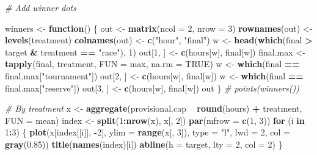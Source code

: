 \documentclass[]{article}
\newenvironment{Shaded}{\begin{snugshade}}{\end{snugshade}}
\newcommand{\KeywordTok}[1]{\textcolor[rgb]{0.13,0.29,0.53}{\textbf{#1}}}
\newcommand{\DataTypeTok}[1]{\textcolor[rgb]{0.13,0.29,0.53}{#1}}
\newcommand{\DecValTok}[1]{\textcolor[rgb]{0.00,0.00,0.81}{#1}}
\newcommand{\FloatTok}[1]{\textcolor[rgb]{0.00,0.00,0.81}{#1}}
\newcommand{\StringTok}[1]{\textcolor[rgb]{0.31,0.60,0.02}{#1}}
\newcommand{\CommentTok}[1]{\textcolor[rgb]{0.56,0.35,0.01}{\textit{#1}}}
\newcommand{\OtherTok}[1]{\textcolor[rgb]{0.56,0.35,0.01}{#1}}
\newcommand{\ControlFlowTok}[1]{\textcolor[rgb]{0.13,0.29,0.53}{\textbf{#1}}}
\newcommand{\OperatorTok}[1]{\textcolor[rgb]{0.81,0.36,0.00}{\textbf{#1}}}
\newcommand{\NormalTok}[1]{#1}
\let\oldShaded\Shaded
\let\endoldShaded\endShaded
\renewenvironment{Shaded}{\footnotesize\oldShaded}{\endoldShaded}
\begin{document}
\begin{Shaded}
\begin{Highlighting}[]
\CommentTok{# Add winner dots}

\NormalTok{winners <-}\StringTok{ }\ControlFlowTok{function}\NormalTok{() \{}
\NormalTok{    out <-}\StringTok{ }\KeywordTok{matrix}\NormalTok{(}\DataTypeTok{ncol =} \DecValTok{2}\NormalTok{, }\DataTypeTok{nrow =} \DecValTok{3}\NormalTok{)}
    \KeywordTok{rownames}\NormalTok{(out) <-}\StringTok{ }\KeywordTok{levels}\NormalTok{(treatment)}
    \KeywordTok{colnames}\NormalTok{(out) <-}\StringTok{ }\KeywordTok{c}\NormalTok{(}\StringTok{"hour"}\NormalTok{, }\StringTok{"final"}\NormalTok{)}
\NormalTok{    w <-}\StringTok{ }\KeywordTok{head}\NormalTok{(}\KeywordTok{which}\NormalTok{(final }\OperatorTok{>}\StringTok{ }\NormalTok{target }\OperatorTok{&}\StringTok{ }\NormalTok{treatment }\OperatorTok{==}\StringTok{ "race"}\NormalTok{), }\DecValTok{1}\NormalTok{)}
\NormalTok{    out[}\DecValTok{1}\NormalTok{, ] <-}\StringTok{ }\KeywordTok{c}\NormalTok{(hours[w], final[w])}
\NormalTok{    final.max <-}\StringTok{ }\KeywordTok{tapply}\NormalTok{(final, treatment, }\DataTypeTok{FUN =}\NormalTok{ max, }\DataTypeTok{na.rm =} \OtherTok{TRUE}\NormalTok{)}
\NormalTok{    w <-}\StringTok{ }\KeywordTok{which}\NormalTok{(final }\OperatorTok{==}\StringTok{ }\NormalTok{final.max[}\StringTok{"tournament"}\NormalTok{])}
\NormalTok{    out[}\DecValTok{2}\NormalTok{, ] <-}\StringTok{ }\KeywordTok{c}\NormalTok{(hours[w], final[w])}
\NormalTok{    w <-}\StringTok{ }\KeywordTok{which}\NormalTok{(final }\OperatorTok{==}\StringTok{ }\NormalTok{final.max[}\StringTok{"reserve"}\NormalTok{])}
\NormalTok{    out[}\DecValTok{3}\NormalTok{, ] <-}\StringTok{ }\KeywordTok{c}\NormalTok{(hours[w], final[w])}
\NormalTok{    out}
\NormalTok{\}}
\CommentTok{# points(winners())}

\CommentTok{# By treatment}
\NormalTok{x <-}\StringTok{ }\KeywordTok{aggregate}\NormalTok{(provisional.cap }\OperatorTok{~}\StringTok{ }\KeywordTok{round}\NormalTok{(hours) }\OperatorTok{+}\StringTok{ }\NormalTok{treatment, }\DataTypeTok{FUN =}\NormalTok{ mean)}
\NormalTok{index <-}\StringTok{ }\KeywordTok{split}\NormalTok{(}\DecValTok{1}\OperatorTok{:}\KeywordTok{nrow}\NormalTok{(x), x[, }\DecValTok{2}\NormalTok{])}
\KeywordTok{par}\NormalTok{(}\DataTypeTok{mfrow =} \KeywordTok{c}\NormalTok{(}\DecValTok{1}\NormalTok{, }\DecValTok{3}\NormalTok{))}
\ControlFlowTok{for}\NormalTok{ (i }\ControlFlowTok{in} \DecValTok{1}\OperatorTok{:}\DecValTok{3}\NormalTok{) \{}
    \KeywordTok{plot}\NormalTok{(x[index[[i]], }\OperatorTok{-}\DecValTok{2}\NormalTok{], }\DataTypeTok{ylim =} \KeywordTok{range}\NormalTok{(x[, }\DecValTok{3}\NormalTok{]), }\DataTypeTok{type =} \StringTok{"l"}\NormalTok{, }
        \DataTypeTok{lwd =} \DecValTok{2}\NormalTok{, }\DataTypeTok{col =} \KeywordTok{gray}\NormalTok{(}\FloatTok{0.85}\NormalTok{))}
    \KeywordTok{title}\NormalTok{(}\KeywordTok{names}\NormalTok{(index)[i])}
    \KeywordTok{abline}\NormalTok{(}\DataTypeTok{h =}\NormalTok{ target, }\DataTypeTok{lty =} \DecValTok{2}\NormalTok{, }\DataTypeTok{col =} \DecValTok{2}\NormalTok{)}
\NormalTok{\}}
\end{Highlighting}
\end{Shaded}
\end{document}
